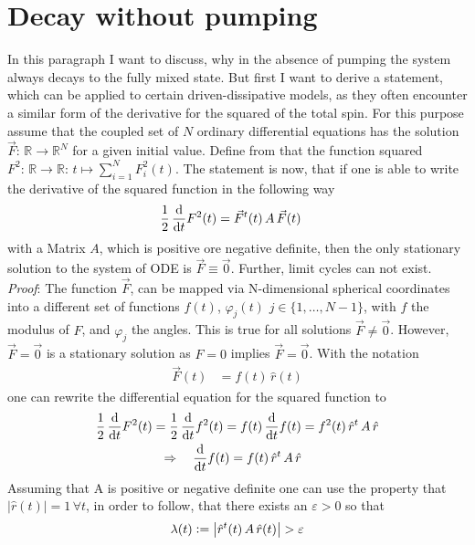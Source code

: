     \section{Decay without pumping}
    \label{appendix:msq_calc}
    In this paragraph I want to discuss, why in the absence of pumping the system always decays to the fully mixed state. But first I want to derive a statement, which can be applied to certain driven-dissipative models, as they often encounter a similar form of the derivative  for the squared of the total spin. For this purpose assume that the coupled set of $N$ ordinary differential equations has the solution $\vec{F}:\,\mathbb{R}\rightarrow\mathbb{R}^N$ for a given initial value. Define from that the function squared $F^2:\,\mathbb{R}\rightarrow\mathbb{R}:\,t\mapsto\sum_{i=1}^NF_i^2(t)$. The statement is now, that if one is able to write the derivative of the squared function in the following way
    \begin{align*}
        \frac{1}{2}\,\frac{\text{d}}{\text{d}t} F^2(t)&=\vec{F}^t(t)\,A\,\vec{F}(t)
    \end{align*}
    with a Matrix $A$, which is positive ore negative definite, then the only stationary solution to the system of ODE is $\vec{F}\equiv\vec{0}$. Further, limit cycles can not exist. \\
    \textit{Proof}: The function $\vec{F}$, can be mapped via N-dimensional spherical coordinates into a different set of functions $f(t)$, $\varphi_j(t)$ $j\in\{1,\dots,N-1\}$, with $f$ the modulus of $F$, and $\varphi_j$ the angles. This is true for all solutions $\vec{F}\neq\vec{0}$. However, $\vec{F}=\vec{0}$ is a stationary solution as $F=0$ implies $\vec{F}=\vec{0}$. With the notation
    \begin{align*}
        \vec{F}(t)&=f(t)\,\hat{r}(t)
    \end{align*}
    one can rewrite the differential equation for the squared function to
    \begin{align*}
        \frac{1}{2}\,\frac{\text{d}}{\text{d}t} F^2(t)=\frac{1}{2}\,\frac{\text{d}}{\text{d}t} f^2(t)=f(t)\,\frac{\text{d}}{\text{d}t} f(t)&=f^2(t)\,\hat{r}^t\,A\,\hat{r}\\
        \Rightarrow\quad\frac{\text{d}}{\text{d}t} f(t) = f(t)\,\hat{r}^t\,A\,\hat{r}
    \end{align*}
    Assuming that A is positive or negative definite one can use the property that $|\hat{r}(t)|=1\,\forall t$, in order to follow, that there exists an $\varepsilon>0$ so that
    \begin{align*}
        \lambda(t)\vcentcolon=\left| \hat{r}^t(t)\,A\,\hat{r}(t) \right| > \varepsilon
    \end{align*}
